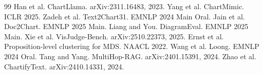 \documentclass[11pt]{article}
\begin{document}

\begin{thebibliography}{99}
 Han et al. ChartLlama. arXiv:2311.16483, 2023.
 Yang et al. ChartMimic. ICLR 2025.
 Zadeh et al. Text2Chart31. EMNLP 2024 Main Oral.
 Jain et al. Doc2Chart. EMNLP 2025 Main.
 Liang and You. DiagramEval. EMNLP 2025 Main.
 Xie et al. VisJudge-Bench. arXiv:2510.22373, 2025.
 Ernst et al. Proposition-level clustering for MDS. NAACL 2022.
 Wang et al. Loong. EMNLP 2024 Oral.
 Tang and Yang. MultiHop-RAG. arXiv:2401.15391, 2024.
 Zhao et al. ChartifyText. arXiv:2410.14331, 2024.
\end{thebibliography}
\end{document}
